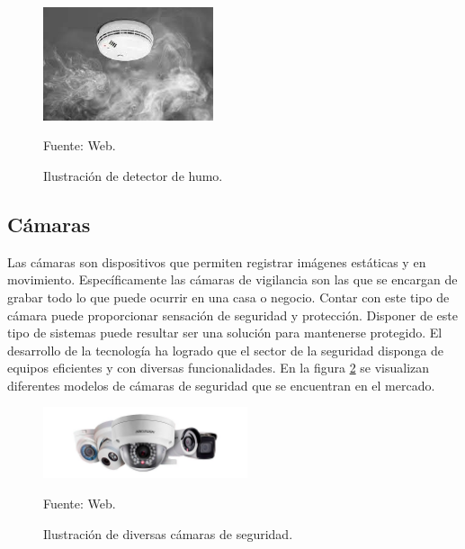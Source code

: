 \begin{figure}[H]
    \begin{center}
        \includegraphics[width=5cm]{img/capitulo_3/sensor_de_humo.jpg}
    \end{center}
    \begin{center}
        \caption{Ilustración de detector de humo.}
        Fuente: Web.
        \label{fig:detector_humo}
    \end{center}
\end{figure}

\subsection{Cámaras}

Las cámaras son dispositivos que permiten registrar imágenes estáticas y en movimiento. Específicamente las cámaras de vigilancia son las que se encargan de grabar todo lo que puede ocurrir en una casa o negocio. Contar con este tipo de cámara puede proporcionar sensación de seguridad y protección. Disponer de este tipo de sistemas puede resultar ser una solución para mantenerse protegido. El desarrollo de la tecnología ha logrado que el sector de la seguridad disponga de equipos eficientes y con diversas funcionalidades. En la figura \ref{fig:camaras} se visualizan diferentes modelos de cámaras de seguridad que se encuentran en el mercado.\\

\begin{figure}[H]
    \begin{center}
        \includegraphics[width=6cm]{img/capitulo_3/camaras.jpg}
    \end{center}
    \begin{center}
        \caption{Ilustración de diversas cámaras de seguridad.}
        Fuente: Web.
        \label{fig:camaras}
    \end{center}
\end{figure}

